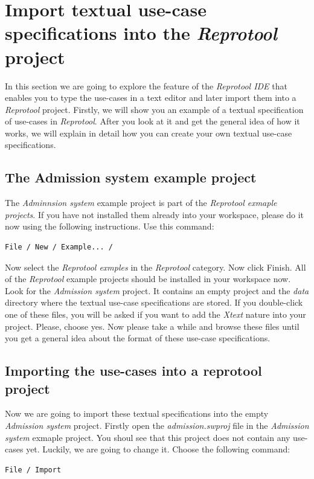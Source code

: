 \section{Import textual use-case specifications into the \emph{Reprotool} project}

In this section we are going to explore the feature of the \emph{Reprotool IDE} that enables you to type the use-cases in a text
editor and later import them into a \emph{Reprotool} project. Firstly, we will show you an example of a textual specification
of use-cases in \emph{Reprotool}. After you look at it and get the general idea of how it works, we will explain in detail how you can
create your own textual use-case specifications.

\subsection{The Admission system example project}

The \emph{Adminnsion system} example project is part of the \emph{Reprotool exmaple projects}. If you have not installed them
already into your workspace, please do it now using the following instructions. Use this command:
\begin{verbatim}
File / New / Example... /
\end{verbatim}

Now select the \emph{Reprotool exmples} in the \emph{Reprotool} category. Now click Finish. All of the \emph{Reprotool} example projects
should be installed in your workspace now. Look for the \emph{Admission system} project.
It contains an empty project and the \emph{data} directory where the textual use-case specifications are stored. If you double-click one
of these files, you will be asked if you want to add the \emph{Xtext} nature into your project. Please, choose yes. Now please take a
while and browse these files until you get a general idea about the format of these use-case specifications.

\subsection{Importing the use-cases into a reprotool project}

Now we are going to import these textual specifications into the empty \emph{Admission system} project. Firstly open the
\emph{admission.swproj} file in the \emph{Admission system} exmaple project. You shoul see that this project does not contain any
use-cases yet. Luckily, we are going to change it. Choose the following command:
\begin{verbatim}
File / Import
\end{verbatim}

